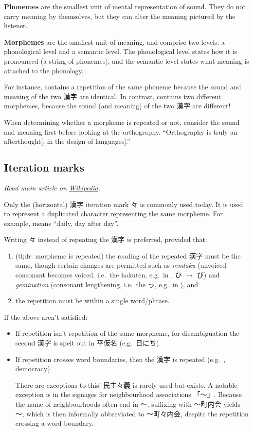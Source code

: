 \documentclass[../nihongo-gakushuu-kyouzai.tex]{subfiles}
\begin{document}
\textbf{Phonemes} are the smallest unit of mental representation of sound. They do not carry meaning by themselves, but they can alter the meaning pictured by the listener.

\textbf{Morphemes} are the smallest unit of meaning, and comprise two levels: a phonological level and a semantic level. The phonological level states how it is pronounced (a string of phonemes), and the semantic level states what meaning is attached to the phonology.

For instance,  contains a repetition of the same phoneme because the sound and meaning of the two 漢字 are identical. In contrast,  contains two different morphemes, because the sound (and meaning) of the two 漢字 are different!

When determining whether a morpheme is repeated or not, consider the sound and meaning first before looking at the orthography. ``Orthography is truly an afterthought[, in the design of languages].''


\subsection{Iteration marks}
\emph{Read main article on \href{https://en.wikipedia.org/wiki/Iteration_mark\#Japanese}{Wikipedia}.}

Only the (horizontal) 漢字 iteration mark 々 is commonly used today. It is used to represent a \ul{duplicated character representing the same morpheme}. For example,  means ``daily, day after day''.

Writing 々 instead of repeating the 漢字 is preferred, provided that:
\begin{enumerate}[label=\arabic*.]
    \item (tl;dr: morpheme is repeated) the reading of the repeated 漢字 must be the same, though certain changes are permitted such as \emph{rendaku} (unvoiced consonant becomes voiced, i.e.\ the hakuten, e.g.\ in , ひ $\to$ び) and \emph{gemination} (consonant lengthening, i.e.\ the っ, e.g.\ in ), and
    \item the repetition must be within a single word/phrase.
\end{enumerate}
If the above aren't satisfied:
\begin{itemize}
    \item If repetition isn't repetition of the same morpheme, for disambiguation the second 漢字 is spelt out in 平仮名 (e.g.\ 日にち).
    \item If repetition crosses word boundaries, then the 漢字 is repeated (e.g.\ , democracy).

    There are exceptions to this! 民主々義 is rarely used but exists. A notable exception is in the signages for neighbourhood associations 「〜」. Because the name of neighbourhoods often end in 〜, suffixing with 〜町内会 yields 〜, which is then informally abbreviated to 〜町々内会, despite the repetition crossing a word boundary.

\end{itemize}
\end{document}

